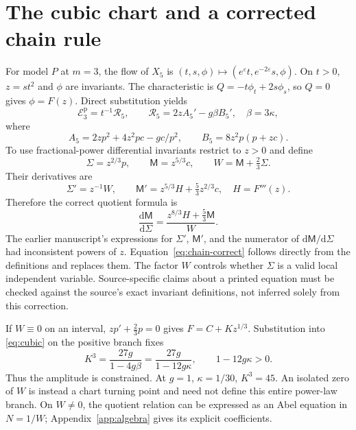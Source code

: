 \documentclass[11pt,a4paper,oneside]{report}
\numberwithin{equation}{chapter}
\newcommand{\E}{\mathcal E}
\newcommand{\R}{\mathcal R}
\newcommand{\dd}{\mathrm d}
\begin{document}
\section{The cubic chart and a corrected chain rule}\label{sec:cubic}
For model $P$ at $m=3$, the flow of $X_5$ is
$(t,s,\phi)\mapsto(e^\varepsilon t,e^{-2\varepsilon}s,\phi)$.
On $t>0$, $z=st^2$ and $\phi$ are invariants. The characteristic is
$Q=-t\phi_t+2s\phi_s$, so $Q=0$ gives $\phi=F(z)$.
Direct substitution yields
\begin{equation}\label{eq:cubic}
\E_3^{\mathrm p}=t^{-1}\R_5,\qquad
\R_5=2zA_5'-g\beta B_5',\quad\beta=3\kappa,
\end{equation}
where
\begin{equation}
A_5=2zp^2+4z^2pc-gc/p^2,\qquad
B_5=8z^2p(p+zc).
\end{equation}
To use fractional-power differential invariants restrict to $z>0$ and define
\begin{equation}
\Sigma=z^{2/3}p,\qquad \mathsf M=z^{5/3}c,
\qquad W=\mathsf M+\tfrac23\Sigma.
\end{equation}
Their derivatives are
\begin{equation}
\Sigma'=z^{-1}W,\qquad
\mathsf M'=z^{5/3}H+\tfrac53z^{2/3}c,
\quad H=F'''(z).
\end{equation}
Therefore the correct quotient formula is
\begin{equation}\boxed{\displaystyle
\frac{\dd\mathsf M}{\dd\Sigma}
=\frac{z^{8/3}H+\tfrac53\mathsf M}{W}.}\label{eq:chain-correct}
\end{equation}
The earlier manuscript's expressions for $\Sigma'$, $\mathsf M'$, and the numerator of $\dd\mathsf M/\dd\Sigma$ had inconsistent powers of $z$. Equation~\eqref{eq:chain-correct} follows directly from the definitions and replaces them. The factor $W$ controls whether $\Sigma$ is a valid local independent variable. Source-specific claims about a printed equation must be checked against the source's exact invariant definitions, not inferred solely from this correction.

If $W\equiv0$ on an interval, $zp'+\tfrac23p=0$ gives
$F=C+Kz^{1/3}$. Substitution into \eqref{eq:cubic} on the positive branch fixes
\begin{equation}\label{eq:power}
K^3=\frac{27g}{1-4g\beta}=\frac{27g}{1-12g\kappa},\qquad 1-12g\kappa>0.
\end{equation}
Thus the amplitude is constrained. At $g=1$, $\kappa=1/30$, $K^3=45$. An isolated zero of $W$ is instead a chart turning point and need not define this entire power-law branch. On $W\ne0$, the quotient relation can be expressed as an Abel equation in $N=1/W$; Appendix~\ref{app:algebra} gives its explicit coefficients.
\end{document}

